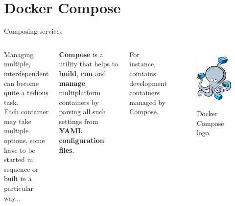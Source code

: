 
\section{Docker Compose}
\graphicspath{{figs/section3/}}

\begin{frame}{Composing services}
	\begin{columns}
		Managing multiple, interdependent  can become quite a tedious task.\\
    \bigskip
		Each container may take multiple options, some have to be started in sequence or built in a particular way...
		\begin{block}{}
			\centering
			\textbf{Compose} is a utility that helps to \textbf{build}, \textbf{run} and \textbf{manage} multiplatform containers by parsing all such settings from \textbf{YAML configuration files}.
		\end{block}
    For instance,  cointains development containers managed by Compose.

		\begin{figure}
			\centering
			\includegraphics[scale=.25]{composeLogo.png}
			\label{fig:compose}
			\caption{Docker Compose logo.}
		\end{figure}
	\end{columns}
\end{frame}

